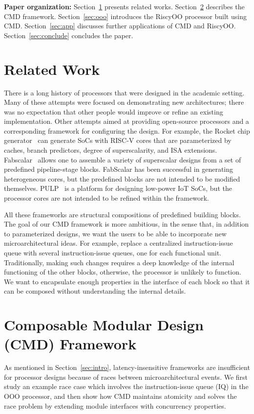 \documentclass[conference]{IEEEtran}
\begin{document}
\noindent\textbf{Paper organization:}
Section~\ref{sec:related} presents related works.
Section~\ref{sec:cmd} describes the CMD framework.
Section~\ref{sec:ooo} introduces the RiscyOO processor built using CMD.
Section~\ref{sec:app} discusses further applications of CMD and RiscyOO.
Section~\ref{sec:conclude} concludes the paper.

\section{Related Work}\label{sec:related}
There is a long history of processors that were designed in the academic setting.
Many of these attempts were focused on demonstrating new architectures; there was no expectation that other people would improve or refine an existing implementation.
Other attempts aimed at providing open-source processors and a corresponding framework for configuring the design.
For example, the Rocket chip generator~\cite{rocketchip} can generate SoCs with RISC-V cores that are parameterized by caches, branch predictors, degree of superscalarity, and ISA extensions.
Fabscalar~\cite{fabscalar} allows one to assemble a variety of superscalar designs from a set of predefined pipeline-stage blocks.
FabScalar has been successful in generating heterogeneous cores, but the predefined blocks are not intended to be modified themselves.
PULP~\cite{pulp} is a platform for designing low-power IoT SoCs, but the processor cores are not intended to be refined within the framework.

All these frameworks are structural compositions of predefined building blocks.
The goal of our CMD framework is more ambitious, in the sense that, in addition to parameterized designs, we want the users to be able to incorporate new microarchitectural ideas.
For example, replace a centralized instruction-issue queue with several instruction-issue queues, one for each functional unit.
Traditionally, making such changes requires a deep knowledge of the internal functioning of the other blocks, otherwise, the processor is unlikely to function. 
We want to encapsulate enough properties in the interface of each block so that it can be composed without understanding the internal details.

\section{Composable Modular Design (CMD) Framework}\label{sec:cmd}

As mentioned in Section~\ref{sec:intro}, latency-insensitive frameworks are insufficient for processor designs because of races between microarchitectural events.
We first study an example race case which involves the instruction-issue queue (IQ) in the OOO processor, and then show how CMD maintains atomicity and solves the race problem by extending module interfaces with concurrency properties.
\end{document}
